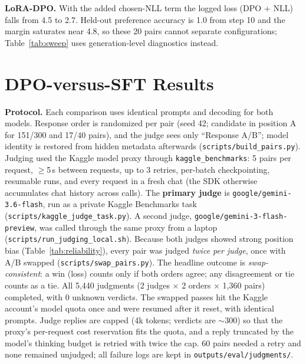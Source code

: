 \documentclass[10pt]{article}
\begin{document}
\textbf{LoRA-DPO.} With the added chosen-NLL term the logged loss (DPO + NLL) falls from 4.5 to 2.7. Held-out preference accuracy is 1.0 from step 10 and the margin saturates near 4.8, so these 20 pairs cannot separate configurations; Table~\ref{tab:sweep} uses generation-level diagnostics instead.

\section{DPO-versus-SFT Results}\label{sec:results}
\textbf{Protocol.} Each comparison uses identical prompts and decoding for both models. Response order is randomized per pair (seed 42; candidate in position A for 151/300 and 17/40 pairs), and the judge sees only ``Response A/B''; model identity is restored from hidden metadata afterwards (\texttt{scripts/build\_pairs.py}). Judging used the Kaggle model proxy through \texttt{kaggle\_benchmarks}: 5 pairs per request, $\ge$5\,s between requests, up to 3 retries, per-batch checkpointing, resumable runs, and every request in a fresh chat (the SDK otherwise accumulates chat history across calls). The \textbf{primary judge} is \texttt{google/gemini-3.6-flash}, run as a private Kaggle Benchmarks task (\texttt{scripts/kaggle\_judge\_task.py}). A second judge, \texttt{google/gemini-3-flash-preview}, was called through the same proxy from a laptop (\texttt{scripts/run\_judging\_local.sh}). Because both judges showed strong position bias (Table~\ref{tab:reliability}), every pair was judged \emph{twice per judge}, once with A/B swapped (\texttt{scripts/swap\_pairs.py}). The headline outcome is \emph{swap-consistent}: a win (loss) counts only if both orders agree; any disagreement or tie counts as a tie. All 5{,}440 judgments (2 judges $\times$ 2 orders $\times$ 1{,}360 pairs) completed, with 0 unknown verdicts. The swapped passes hit the Kaggle account's model quota once and were resumed after it reset, with identical prompts. Judge replies are capped (4k tokens; verdicts are $\sim$300) so that the proxy's per-request cost reservation fits the quota, and a reply truncated by the model's thinking budget is retried with twice the cap. 60 pairs needed a retry and none remained unjudged; all failure logs are kept in \texttt{outputs/eval/judgments/}.
\end{document}
